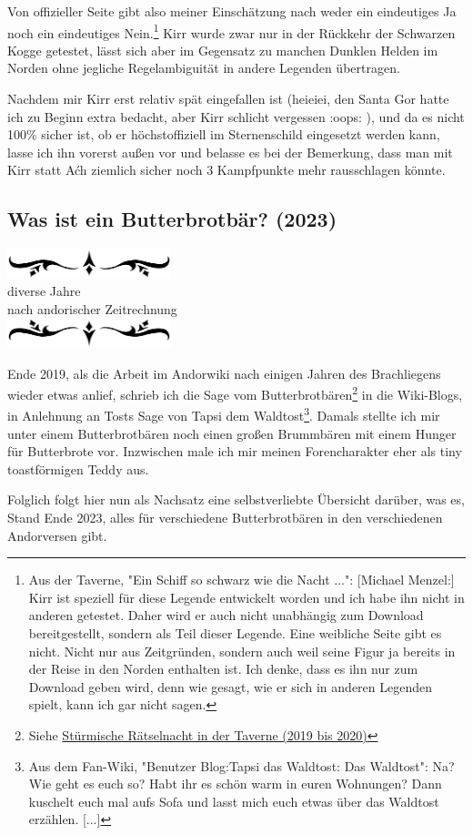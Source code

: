 \documentclass[10pt, a4paper, oneside]{book}
\newcommand{\hypref}[1]{%
    \hyperref[#1]{#1}%
}
\newcommand{\az}[1]{%
    \begin{center}
        \includegraphics[width=180px]{Das Erbe des Wunderkindes/verzierung1.png}\\
        {\Huge #1} \\
        {nach andorischer Zeitrechnung}\\
        \includegraphics[width=180px]{Das Erbe des Wunderkindes/verzierung2.png}
    \end{center}
    \extramarks{}{#1 a.Z.}
}
\begin{document}
{Von offizieller Seite gibt also meiner Einschätzung nach weder ein eindeutiges Ja noch ein eindeutiges Nein.\footnote{Aus der Taverne, "Ein Schiff so schwarz wie die Nacht ...": [Michael Menzel:] Kirr ist speziell für diese Legende entwickelt worden und ich habe ihn nicht in anderen getestet. Daher wird er auch nicht unabhängig zum Download bereitgestellt, sondern als Teil dieser Legende. Eine weibliche Seite gibt es nicht. Nicht nur aus Zeitgründen, sondern auch weil seine Figur ja bereits in der Reise in den Norden enthalten ist. Ich denke, dass es ihn nur zum Download geben wird, denn wie gesagt, wie er sich in anderen Legenden spielt, kann ich gar nicht sagen.} Kirr wurde zwar nur in der Rückkehr der Schwarzen Kogge getestet, lässt sich aber im Gegensatz zu manchen Dunklen Helden im Norden ohne jegliche Regelambiguität in andere Legenden übertragen.



Nachdem mir Kirr erst relativ spät eingefallen ist (heieiei, den Santa Gor hatte ich zu Beginn extra bedacht, aber Kirr schlicht vergessen :oops: ), und da es nicht 100\% sicher ist, ob er höchstoffiziell im Sternenschild eingesetzt werden kann, lasse ich ihn vorerst außen vor und belasse es bei der Bemerkung, dass man mit Kirr statt Aćh ziemlich sicher noch 3 Kampfpunkte mehr rausschlagen könnte.

}


\begin{chapterbox}
    \chapter{Was ist ein Butterbrotbär? (2023)}
    \label{Was ist ein Butterbrotbär? (2023)}
    \az{diverse Jahre}
    
    Ende 2019, als die Arbeit im Andorwiki nach einigen Jahren des Brachliegens wieder etwas anlief, schrieb ich die Sage vom Butterbrotbären\footnote{Siehe \hypref{Stürmische Rätselnacht in der Taverne (2019 bis 2020)}} in die Wiki-Blogs, in Anlehnung an Tosts Sage von Tapsi dem Waldtost\footnote{Aus dem Fan-Wiki, "Benutzer Blog:Tapsi das Waldtost: Das Waldtost": Na? Wie geht es euch so? Habt ihr es schön warm in euren Wohnungen? Dann kuschelt euch mal aufs Sofa und lasst mich euch etwas über das Waldtost erzählen. [...]}. Damals stellte ich mir unter einem Butterbrotbären noch einen großen Brummbären mit einem Hunger für Butterbrote vor. Inzwischen male ich mir meinen Forencharakter eher als tiny toastförmigen Teddy aus.

    Folglich folgt hier nun als Nachsatz eine selbstverliebte Übersicht darüber, was es, Stand Ende 2023, alles für verschiedene Butterbrotbären in den verschiedenen Andorversen gibt.
\end{chapterbox}
\end{document}
